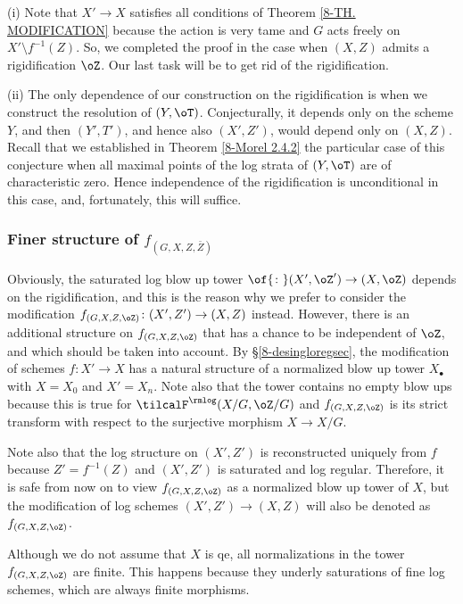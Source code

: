 \documentclass[10pt]{../fichiers-configuration-latex/smfart}
\begin{document}
\begin{remark2}\label{8-constrrem} (i) Note that $X'\to X$ satisfies
all conditions of Theorem \ref{8-TH. MODIFICATION} because the action
is very tame and $G$ acts freely on $X'\setminus f^{-1}(Z)$. So, we
completed the proof in the case when $(X,Z)$ admits a rigidification
$\oZ$. Our last task will be to get rid of the rigidification.

(ii) The only dependence of our construction on the rigidification
is when we construct the resolution of $(Y,\oT)$. Conjecturally,
it depends only on the scheme $Y$, and then $(Y',T')$, and hence
also $(X',Z')$, would depend only on $(X,Z)$. Recall that we
established in Theorem \ref{8-Morel 2.4.2} the particular case
of this conjecture when all maximal points of the log strata of
$(Y,\oT)$ are of characteristic zero. Hence independence of the
rigidification is unconditional in this case, and, fortunately,
this will suffice.  \end{remark2}

\subsubsection{Finer structure of
$f_{(G,X,Z,\overline{Z})}$}\label{8-finersec} Obviously, the saturated
log blow up tower $\of{\colon}(X',\oZ')\to(X,\oZ)$ depends on the
rigidification, and this is the reason why we prefer to consider
the modification $f_{(G,X,Z,\oZ)}{\colon}(X',Z')\to(X,Z)$
instead. However, there is an additional structure on
$f_{(G,X,Z,\oZ)}$ that has a chance to be independent of $\oZ$, and
which should be taken into account. By \S\ref{8-desingloregsec}, the
modification of schemes $f{\colon}X'\to X$ has a natural structure of
a normalized blow up tower $X_\bullet$ with $X=X_0$ and $X'=X_n$. Note
also that the tower contains no empty blow ups because this is true
for $\tilcalF^\rmlog(X/G,\oZ/G)$ and $f_{(G,X,Z,\oZ)}$ is its strict
transform with respect to the surjective morphism $X\to X/G$.

Note also that the log structure on $(X',Z')$ is reconstructed
uniquely from $f$ because $Z'=f^{-1}(Z)$ and $(X',Z')$ is
saturated and log regular. Therefore, it is safe from now on to
view $f_{(G,X,Z,\oZ)}$ as a normalized blow up tower of $X$, but
the modification of log schemes $(X',Z')\to(X,Z)$ will also be
denoted as $f_{(G,X,Z,\oZ)}$.

\begin{remark2}\label{8-finnormrem} Although we do not assume that
$X$ is qe, all normalizations in the tower $f_{(G,X,Z,\oZ)}$ are
finite. This happens because they underly saturations of fine log
schemes, which are always finite morphisms.  \end{remark2}
\end{document}

